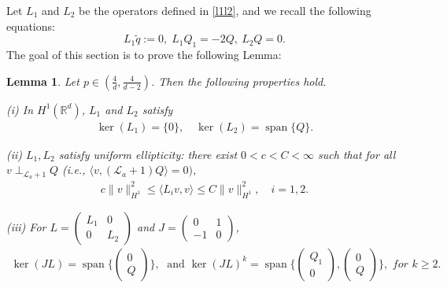 \documentclass[12pt]{amsart}
\newcommand{\R}{\mathbb R}
\newcommand{\la}{\mathcal L_a}
\newcommand{\tq}{\tilde q}
\newtheorem{lemma}[theorem]{Lemma}
\DeclareMathOperator{\spa}{span}
\begin{document}
Let $L_1$ and $L_2$ be the operators defined in \eqref{l1l2}, and we recall the following equations:
\begin{equation}\label{79.1}
L_1 \tq:=0,\; 
L_1 Q_1=-2Q, \:
L_2 Q=0.
\end{equation}
The goal of this section is to prove the following Lemma:
\begin{lemma}\label{lm: l2} 
 Let $p\in (\frac 4d, \frac 4{d-2})
$.  Then the following properties hold. 

(i) In $H^1(\R^d)$, $L_1$ and $L_2$ satisfy
\begin{align}\label{524}
\ker(L_1)=\{0\}, \quad \ker(L_2)=\spa \{Q\}.
\end{align}



(ii) 
$L_1, L_2$ satisfy uniform ellipticity: there exist $0<c<C<\infty$ such that for all $v\perp_{\la+1}Q$ (i.e., $\langle v, (\la+1)Q\rangle=0)$,
\begin{align*}
c\|v\|_{H^1}^2\le \langle L_i v, v\rangle \le C\|v\|_{H^1}^2, \quad i=1,2.
\end{align*}


(iii) For $L=\begin{pmatrix} L_1&0\\0&L_2\end{pmatrix}$ and $J=\begin{pmatrix}0&1\\-1&0\end{pmatrix}$, 
 \begin{gather*}
 \ker{(JL)}=\spa\bigl\{\begin{pmatrix}0\\Q\end{pmatrix}\bigr\}, 
 \; \text{ and }
 \ker{(JL)^k}=\spa\bigl\{\begin{pmatrix}Q_1\\0\end{pmatrix}, \begin{pmatrix}0\\Q\end{pmatrix}\bigr\}, \textit{ for }k\ge 2. 
 \end{gather*} 
\end{lemma} 
\end{document}
